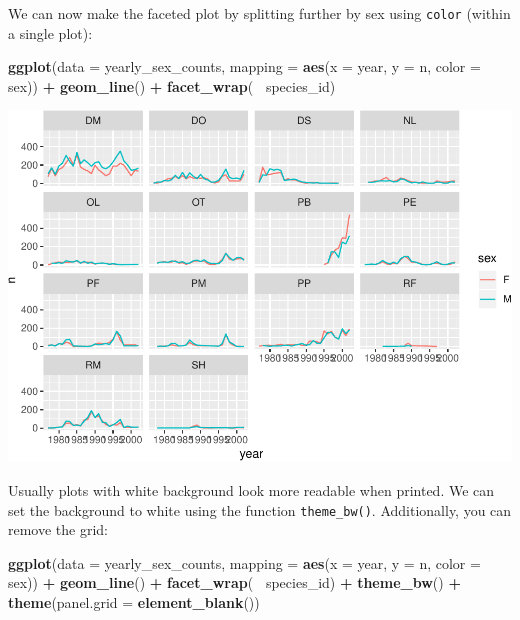 \documentclass[]{book}
\newenvironment{Shaded}{\begin{snugshade}}{\end{snugshade}}
\newcommand{\KeywordTok}[1]{\textcolor[rgb]{0.13,0.29,0.53}{\textbf{#1}}}
\newcommand{\DataTypeTok}[1]{\textcolor[rgb]{0.13,0.29,0.53}{#1}}
\newcommand{\StringTok}[1]{\textcolor[rgb]{0.31,0.60,0.02}{#1}}
\newcommand{\OperatorTok}[1]{\textcolor[rgb]{0.81,0.36,0.00}{\textbf{#1}}}
\newcommand{\NormalTok}[1]{#1}
\begin{document}
We can now make the faceted plot by splitting further by sex using
\texttt{color} (within a single plot):

\begin{Shaded}
\begin{Highlighting}[]
 \KeywordTok{ggplot}\NormalTok{(}\DataTypeTok{data =}\NormalTok{ yearly_sex_counts, }\DataTypeTok{mapping =} \KeywordTok{aes}\NormalTok{(}\DataTypeTok{x =}\NormalTok{ year, }\DataTypeTok{y =}\NormalTok{ n, }\DataTypeTok{color =}\NormalTok{ sex)) }\OperatorTok{+}
\StringTok{     }\KeywordTok{geom_line}\NormalTok{() }\OperatorTok{+}
\StringTok{     }\KeywordTok{facet_wrap}\NormalTok{(}\OperatorTok{~}\StringTok{ }\NormalTok{species_id)}
\end{Highlighting}
\end{Shaded}

\includegraphics{img/R-ecology-facet-by-species-and-sex-1.pdf}

Usually plots with white background look more readable when printed. We
can set the background to white using the function \texttt{theme\_bw()}.
Additionally, you can remove the grid:

\begin{Shaded}
\begin{Highlighting}[]
 \KeywordTok{ggplot}\NormalTok{(}\DataTypeTok{data =}\NormalTok{ yearly_sex_counts, }\DataTypeTok{mapping =} \KeywordTok{aes}\NormalTok{(}\DataTypeTok{x =}\NormalTok{ year, }\DataTypeTok{y =}\NormalTok{ n, }\DataTypeTok{color =}\NormalTok{ sex)) }\OperatorTok{+}
\StringTok{     }\KeywordTok{geom_line}\NormalTok{() }\OperatorTok{+}
\StringTok{     }\KeywordTok{facet_wrap}\NormalTok{(}\OperatorTok{~}\StringTok{ }\NormalTok{species_id) }\OperatorTok{+}
\StringTok{     }\KeywordTok{theme_bw}\NormalTok{() }\OperatorTok{+}
\StringTok{     }\KeywordTok{theme}\NormalTok{(}\DataTypeTok{panel.grid =} \KeywordTok{element_blank}\NormalTok{())}
\end{Highlighting}
\end{Shaded}
\end{document}
